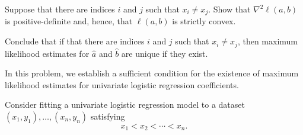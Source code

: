 \documentclass[12pt]{exam}
\begin{document}
\begin{questions}
\begin{parts}
    \item Suppose that there are indices $i$ and $j$ such that $x_i\neq x_j$.
    Show that $\nabla^2 \ell(a,b)$ is positive-definite and, hence, that $\ell(a,b)$ is strictly convex.
    
    \item Conclude that if that there are indices $i$ and $j$ such that $x_i\neq x_j$, then
    maximum likelihood estimates for $\hat a$ and $\hat b$ are unique if they exist.
\end{parts}

    
    \question In this problem, we establish a sufficient condition for the existence of
    maximum likelihood estimates for univariate logistic regression coefficients.

    Consider fitting a univariate logistic regression model to a dataset
    $(x_1, y_1),\ldots,(x_n, y_n)$ satisfying
    \[
        x_1<x_2<\cdots<x_n.
    \]


\end{questions}
\end{document}
